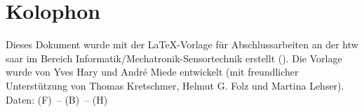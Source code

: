 \pagestyle{empty}

\hfill

\vfill

\section*{Kolophon}
Dieses Dokument wurde mit der \LaTeX-Vorlage für Abschlussarbeiten an der htw saar im Bereich Informatik/Mechatronik-Sensortechnik erstellt (\currentVersion). Die Vorlage wurde von Yves Hary und Andr\'e Miede entwickelt (mit freundlicher Unterstützung von Thomas Kretschmer, Helmut G. Folz und Martina Lehser). Daten: (F)\makeatletter\f@size\makeatother\ -- (B)\the\textwidth\ -- (H)\the\textheight\

